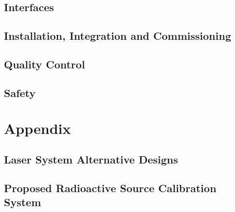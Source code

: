 \subsection{Interfaces}
\label{sec:sp-calib-intfc}

\subsection{Installation, Integration and Commissioning}
\label{sec:sp-calib-iic}

\subsection{Quality Control}
\label{sec:sp-calib-qc}

\subsection{Safety}
\label{sec:sp-calib-safe}

\newpage

\section{Appendix}
\subsection{Laser System Alternative Designs}
\label{sec:sp-calib-laser-alter}


\subsection{Proposed Radioactive Source Calibration System}
\label{sec:sp-calib-sys-rsds}


